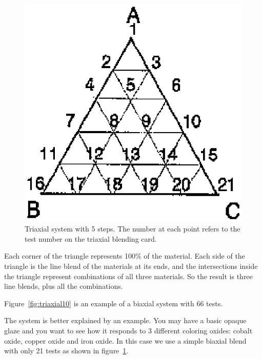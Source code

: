 \begin{figure}[htbp!]
  \centering
  \includegraphics[width=0.7\linewidth]{img/triaxial5.eps}
  \caption{Triaxial system with 5 steps. The number at each point refers to the 
    test number on the triaxial blending card.}
  \label{fig:triaxial5}
\end{figure}
Each corner of the triangle represents 100\% of the material. Each side of the 
triangle is the line blend of the materials at its ends, and the intersections 
inside the triangle represent combinations of all three materials. So the 
result is three line blends, plus all the combinations. 

Figure~\ref{fig:triaxial10} is an example of a biaxial system with 66 tests.

The system is better explained by an example. You may have a basic opaque glaze 
and you want to see how it responds to 3 different coloring oxides: cobalt 
oxide, copper oxide and iron oxide. In this case we use a simple biaxial blend 
with only 21 tests as shown in figure~\ref{fig:triaxial5}.

